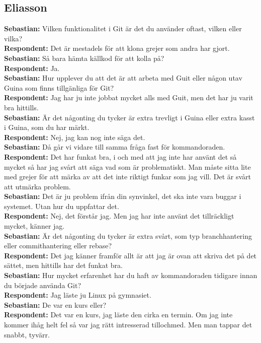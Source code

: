 \documentclass[a4paper,oneside]{bth} %
\begin{document}
		\subsection{Eliasson}
		\textbf{Sebastian:} Vilken funktionalitet i Git är det du använder oftast, vilken eller vilka?
		\\\textbf{Respondent:} Det är mestadels för att klona grejer som andra har gjort.
		\\\textbf{Sebastian:} Så bara hämta källkod för att kolla på?
		\\\textbf{Respondent:} Ja.
		\\\textbf{Sebastian:} Hur upplever du att det är att arbeta med Guit eller någon utav Guina som finns tillgänliga för Git?
		\\\textbf{Respondent:} Jag har ju inte jobbat mycket alls med Guit, men det har ju varit bra hittills.
		\\\textbf{Sebastian:} Är det någonting du tycker är extra trevligt i Guina eller extra kasst i Guina, som du har märkt.
		\\\textbf{Respondent:} Nej, jag kan nog inte säga det.
		\\\textbf{Sebastian:} Då går vi vidare till samma fråga fast för kommandoraden.
		\\\textbf{Respondent:} Det har funkat bra, i och med att jag inte har använt det så mycket så har jag svårt att säga vad som är problematiskt. Man måste sitta lite med grejer för att märka av att det inte riktigt funkar som jag vill. Det är svårt att utmärka problem.
		\\\textbf{Sebastian:} Det är ju problem ifrån din synvinkel, det ska inte vara buggar i systemet. Utan hur du uppfattar det.
		\\\textbf{Respondent:} Nej, det förstår jag. Men jag har inte använt det tillräckligt mycket, känner jag.
		\\\textbf{Sebastian:} Är det någonting du tycker är extra svårt, som typ branchhantering eller commithantering eller rebase?
		\\\textbf{Respondent:} Det jag känner framför allt är att jag är ovan att skriva det på det sättet, men hittills har det funkat bra.
		\\\textbf{Sebastian:} Hur mycket erfarenhet har du haft av kommandoraden tidigare innan du började använda Git?
		\\\textbf{Respondent:} Jag läste ju Linux på gymnasiet.
		\\\textbf{Sebastian:} De var en kurs eller?
		\\\textbf{Respondent:} Det var en kurs, jag läste den cirka en termin. Om jag inte kommer ihåg helt fel så var jag rätt intresserad tillochmed. Men man tappar det snabbt, tyvärr.
\end{document}
